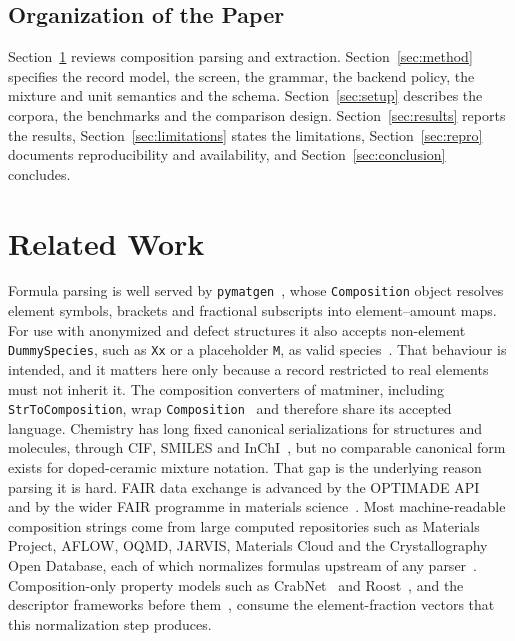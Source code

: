 \documentclass[10pt,journal]{IEEEtran}
\newcommand{\pmg}{\texttt{pymatgen}\xspace}
\begin{document}
\subsection{Organization of the Paper}
\label{sec:organization}
Section~\ref{sec:related} reviews composition parsing and extraction. Section~\ref{sec:method} specifies the record model, the screen, the grammar, the backend policy, the mixture and unit semantics and the schema. Section~\ref{sec:setup} describes the corpora, the benchmarks and the comparison design. Section~\ref{sec:results} reports the results, Section~\ref{sec:limitations} states the limitations, Section~\ref{sec:repro} documents reproducibility and availability, and Section~\ref{sec:conclusion} concludes.

\section{Related Work}
\label{sec:related}
Formula parsing is well served by \pmg~\cite{pymatgen2013,pymatgen2026}, whose \texttt{Composition} object resolves element symbols, brackets and fractional subscripts into element--amount maps. For use with anonymized and defect structures it also accepts non-element \texttt{DummySpecies}, such as \texttt{Xx} or a placeholder \texttt{M}, as valid species~\cite{pymatgen2026}. That behaviour is intended, and it matters here only because a record restricted to real elements must not inherit it. The composition converters of matminer, including \texttt{StrToComposition}, wrap \texttt{Composition}~\cite{ward2018matminer} and therefore share its accepted language. Chemistry has long fixed canonical serializations for structures and molecules, through CIF, SMILES and InChI~\cite{hall1991cif,weininger1988smiles,heller2015inchi}, but no comparable canonical form exists for doped-ceramic mixture notation. That gap is the underlying reason parsing it is hard. FAIR data exchange is advanced by the OPTIMADE API~\cite{optimade2024} and by the wider FAIR programme in materials science~\cite{wilkinson2016fair,draxl2018nomad,scheffler2022fair}. Most machine-readable composition strings come from large computed repositories such as Materials Project, AFLOW, OQMD, JARVIS, Materials Cloud and the Crystallography Open Database, each of which normalizes formulas upstream of any parser~\cite{jain2013mp,curtarolo2012aflow,kirklin2015oqmd,choudhary2020jarvis,talirz2020materialscloud,grazulis2012cod}. Composition-only property models such as CrabNet~\cite{crabnet2021} and Roost~\cite{roost2020}, and the descriptor frameworks before them~\cite{ward2016general,ward2018matminer,dunn2020matbench}, consume the element-fraction vectors that this normalization step produces.
\end{document}
